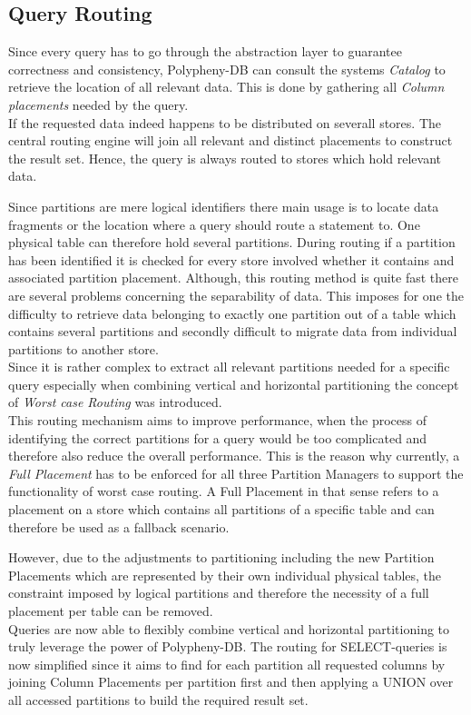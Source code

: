 \subsection{Query Routing}
Since every query has to go through the abstraction layer to guarantee correctness 
and consistency, Polypheny-DB can consult the systems \textit{Catalog} to retrieve the
location of all relevant data. This is done by gathering all 
\textit{Column placements} needed by the query.\\ 
If the requested data indeed happens to be distributed
on severall stores. The central routing engine will join all relevant and distinct 
placements to construct the result set. Hence, the query is always routed to stores which 
hold relevant data.


Since partitions are mere logical identifiers there main usage is to locate data fragments or the location where a query should route a statement to.
One physical table can therefore hold several partitions.
During routing if a partition has been identified it is checked for every store involved whether it contains and associated partition placement.
Although, this routing method is quite fast there are several problems concerning the separability of data.
This imposes for one the difficulty to retrieve data belonging to exactly one partition out of a table which contains several partitions and secondly difficult 
to migrate data from individual partitions to another store.\\
Since it is rather complex to extract all relevant partitions needed for a specific query especially when combining vertical and horizontal partitioning
the concept of \textit{Worst case Routing} was introduced.\\
This routing mechanism aims to improve performance, when the process of identifying the correct partitions for a query would be too complicated and 
therefore also reduce the overall performance.   
This is the reason why currently, a \textit{Full Placement} has to be enforced for all three Partition Managers to support the functionality of worst case routing.
A Full Placement in that sense refers to a placement on a store which contains all partitions of a specific table and can therefore be used as a fallback scenario.

However, due to the adjustments to partitioning including the new Partition Placements which are represented by their own individual physical tables, the constraint imposed by logical 
partitions and therefore the necessity of a full placement per table can be removed.\\
Queries are  now able to flexibly combine vertical and horizontal partitioning to truly leverage the power of Polypheny-DB.
The routing for SELECT-queries is now simplified since it aims to find for each partition all requested columns by 
joining Column Placements per partition first and then applying a UNION over all accessed partitions to build the required result set.


